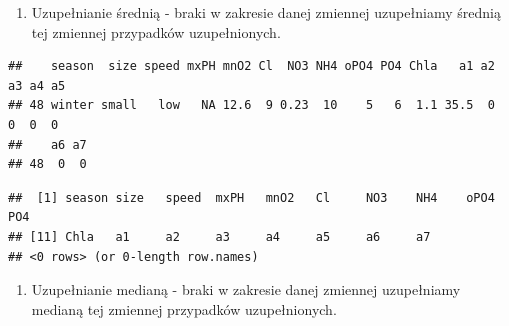 \documentclass[]{book}
\newenvironment{Shaded}{\begin{snugshade}}{\end{snugshade}}
\newcommand{\DataTypeTok}[1]{\textcolor[rgb]{0.13,0.29,0.53}{#1}}
\newcommand{\KeywordTok}[1]{\textcolor[rgb]{0.13,0.29,0.53}{\textbf{#1}}}
\newcommand{\NormalTok}[1]{#1}
\newcommand{\OperatorTok}[1]{\textcolor[rgb]{0.81,0.36,0.00}{\textbf{#1}}}
\newcommand{\StringTok}[1]{\textcolor[rgb]{0.31,0.60,0.02}{#1}}
\providecommand{\tightlist}{%
  \setlength{\itemsep}{0pt}\setlength{\parskip}{0pt}}
\theoremstyle{plain}
\theoremstyle{definition}
\theoremstyle{definition}
\theoremstyle{definition}
\theoremstyle{definition}
\theoremstyle{remark}
\begin{document}
\begin{enumerate}
\def\labelenumi{\arabic{enumi}.}
\tightlist
\item
  Uzupełnianie średnią - braki w zakresie danej zmiennej uzupełniamy średnią tej zmiennej przypadków uzupełnionych.
\end{enumerate}

\begin{Shaded}
\end{Shaded}

\begin{verbatim}
##    season  size speed mxPH mnO2 Cl  NO3 NH4 oPO4 PO4 Chla   a1 a2 a3 a4 a5
## 48 winter small   low   NA 12.6  9 0.23  10    5   6  1.1 35.5  0  0  0  0
##    a6 a7
## 48  0  0
\end{verbatim}

\begin{Shaded}
\end{Shaded}

\begin{verbatim}
##  [1] season size   speed  mxPH   mnO2   Cl     NO3    NH4    oPO4   PO4   
## [11] Chla   a1     a2     a3     a4     a5     a6     a7    
## <0 rows> (or 0-length row.names)
\end{verbatim}

\begin{enumerate}
\def\labelenumi{\arabic{enumi}.}
\setcounter{enumi}{1}
\tightlist
\item
  Uzupełnianie medianą - braki w zakresie danej zmiennej uzupełniamy medianą tej zmiennej przypadków uzupełnionych.
\end{enumerate}

\begin{Shaded}
\end{Shaded}
\end{document}
